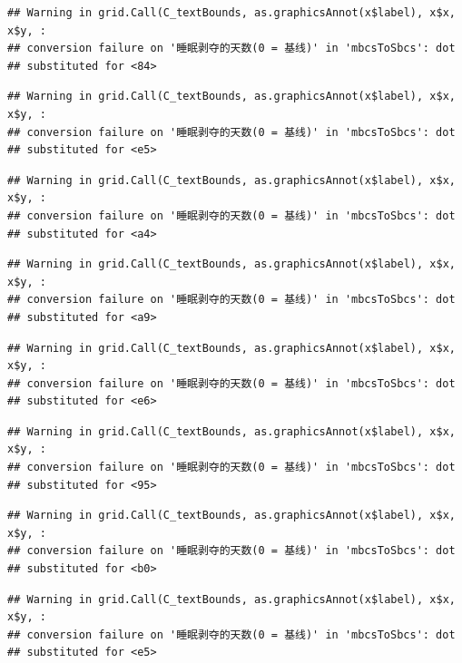 \documentclass[
]{book}
\begin{document}
\begin{verbatim}
## Warning in grid.Call(C_textBounds, as.graphicsAnnot(x$label), x$x, x$y, :
## conversion failure on '睡眠剥夺的天数(0 = 基线)' in 'mbcsToSbcs': dot
## substituted for <84>
\end{verbatim}

\begin{verbatim}
## Warning in grid.Call(C_textBounds, as.graphicsAnnot(x$label), x$x, x$y, :
## conversion failure on '睡眠剥夺的天数(0 = 基线)' in 'mbcsToSbcs': dot
## substituted for <e5>
\end{verbatim}

\begin{verbatim}
## Warning in grid.Call(C_textBounds, as.graphicsAnnot(x$label), x$x, x$y, :
## conversion failure on '睡眠剥夺的天数(0 = 基线)' in 'mbcsToSbcs': dot
## substituted for <a4>
\end{verbatim}

\begin{verbatim}
## Warning in grid.Call(C_textBounds, as.graphicsAnnot(x$label), x$x, x$y, :
## conversion failure on '睡眠剥夺的天数(0 = 基线)' in 'mbcsToSbcs': dot
## substituted for <a9>
\end{verbatim}

\begin{verbatim}
## Warning in grid.Call(C_textBounds, as.graphicsAnnot(x$label), x$x, x$y, :
## conversion failure on '睡眠剥夺的天数(0 = 基线)' in 'mbcsToSbcs': dot
## substituted for <e6>
\end{verbatim}

\begin{verbatim}
## Warning in grid.Call(C_textBounds, as.graphicsAnnot(x$label), x$x, x$y, :
## conversion failure on '睡眠剥夺的天数(0 = 基线)' in 'mbcsToSbcs': dot
## substituted for <95>
\end{verbatim}

\begin{verbatim}
## Warning in grid.Call(C_textBounds, as.graphicsAnnot(x$label), x$x, x$y, :
## conversion failure on '睡眠剥夺的天数(0 = 基线)' in 'mbcsToSbcs': dot
## substituted for <b0>
\end{verbatim}

\begin{verbatim}
## Warning in grid.Call(C_textBounds, as.graphicsAnnot(x$label), x$x, x$y, :
## conversion failure on '睡眠剥夺的天数(0 = 基线)' in 'mbcsToSbcs': dot
## substituted for <e5>
\end{verbatim}
\end{document}
